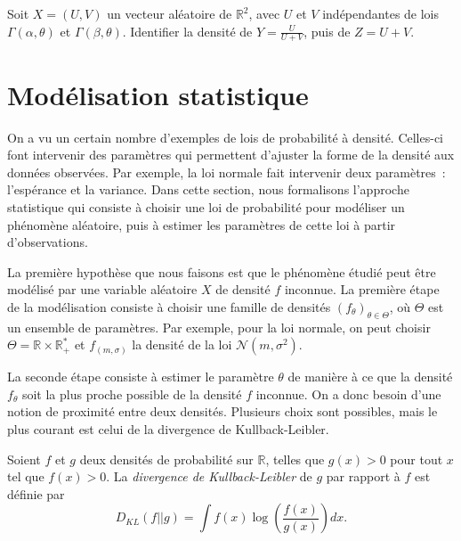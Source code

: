 \label{II-exo-loibeta}
Soit \(X = (U,V)\) un vecteur aléatoire de \(\mathbb{R}^2\), avec \(U\)
et \(V\) indépendantes de lois \(\Gamma(\alpha,\theta)\) et
\(\Gamma(\beta,\theta)\). Identifier la densité de
\(Y = \frac{U}{U+V}\), puis de
\(Z = U+V\).

\chapter{Modélisation statistique}\label{II-moduxe9lisation-statistique}

On a vu un certain nombre d'exemples de lois de probabilité à densité.
Celles-ci font intervenir des paramètres qui permettent d'ajuster la
forme de la densité aux données observées. Par exemple, la loi normale
fait intervenir deux paramètres~: l'espérance et la variance. Dans cette
section, nous formalisons l'approche statistique qui consiste à choisir
une loi de probabilité pour modéliser un phénomène aléatoire, puis à
estimer les paramètres de cette loi à partir d'observations.

La première hypothèse que nous faisons est que le phénomène étudié peut
être modélisé par une variable aléatoire \(X\) de densité \(f\)
inconnue. La première étape de la modélisation consiste à choisir une
famille de densités \((f_\theta)_{\theta \in \Theta}\), où \(\Theta\)
est un ensemble de paramètres. Par exemple, pour la loi normale, on peut
choisir \(\Theta = \mathbb{R}\times \mathbb{R}_+^*\) et
\(f_{(m,\sigma)}\) la densité de la loi \(\mathcal{N}(m,\sigma^2)\).

La seconde étape consiste à estimer le paramètre \(\theta\) de manière à
ce que la densité \(f_\theta\) soit la plus proche possible de la
densité \(f\) inconnue. On a donc besoin d'une notion de proximité entre
deux densités. Plusieurs choix sont possibles, mais le plus courant est
celui de la divergence de Kullback-Leibler.

\begin{definition}\label{II-defKL}

Soient \(f\) et \(g\) deux densités de probabilité sur \(\mathbb{R}\),
telles que \(g(x) > 0\) pour tout \(x\) tel que \(f(x) > 0\). La
\emph{divergence de Kullback-Leibler} de \(g\) par rapport à \(f\) est
définie par
\[ D_{KL}(f||g) = \int f(x) \log\left(\frac{f(x)}{g(x)}\right) dx.\]
\end{definition}


